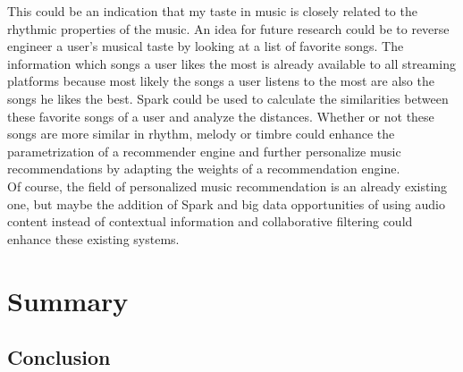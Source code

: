 \noindent This could be an indication that my taste in music is closely related to the rhythmic properties of the music. 
An idea for future research could be to reverse engineer a user's musical taste by looking at a list of favorite songs. The information which songs a user likes the most is already available to all streaming platforms because most likely the songs a user listens to the most are also the songs he likes the best. Spark could be used to calculate the similarities between these favorite songs of a user and analyze the distances. Whether or not these songs are more similar in rhythm, melody or timbre could enhance the parametrization of a recommender engine and further personalize music recommendations by adapting the weights of a recommendation engine.\\
Of course, the field of personalized music recommendation is an already existing one, but maybe the addition of Spark and big data opportunities of using audio content instead of contextual information and collaborative filtering could enhance these existing systems. 

\chapter{Summary}\label{summarych}

\section{Conclusion}

